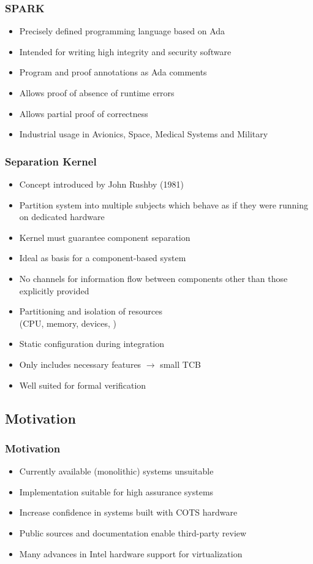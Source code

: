 \documentclass[xcolor={dvipsnames}]{beamer}
\begin{document}
\begin{frame}\frametitle{SPARK}
\begin{itemize}
	\item Precisely defined programming language based on Ada
	\item Intended for writing high integrity and security software
	\item Program and proof annotations as Ada comments
	\item Allows proof of absence of runtime errors
	\item Allows partial proof of correctness
	\item Industrial usage in Avionics, Space, Medical Systems and Military
\end{itemize}


\end{frame}

\begin{frame}\frametitle{Separation Kernel}
\begin{itemize}
	\item Concept introduced by John Rushby (1981)
	\item Partition system into multiple subjects which behave as if they were running on dedicated hardware
	\item Kernel must guarantee component separation
	\item Ideal as basis for a component-based system
	\item No channels for information flow between components other than those explicitly provided
	\item Partitioning and isolation of resources\\(CPU, memory, devices, \textellipsis)
	\item Static configuration during integration
	\item Only includes necessary features $\rightarrow$ small TCB
	\item Well suited for formal verification
\end{itemize}
\end{frame}

\subsection{Motivation}
\begin{frame}\frametitle{Motivation}
\begin{itemize}
	\item Currently available (monolithic) systems unsuitable
	\item Implementation suitable for high assurance systems
	\item Increase confidence in systems built with COTS hardware
	\item Public sources and documentation enable third-party review
	\item Many advances in Intel hardware support for virtualization
\end{itemize}
\end{frame}
\end{document}
